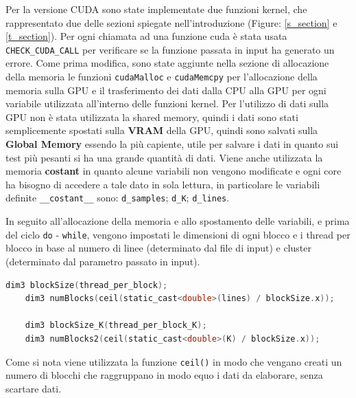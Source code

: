 \documentclass{article}
\begin{document}
  Per la versione CUDA sono state implementate due funzioni kernel, che rappresentato due delle sezioni spiegate nell'introduzione (Figure: \ref{s_section} e \ref{t_section}). Per ogni chiamata ad una funzione cuda è stata usata \verb|CHECK_CUDA_CALL| per verificare se la funzione passata in input ha generato un errore.
  Come prima modifica, sono state aggiunte nella sezione di allocazione della memoria le funzioni \verb|cudaMalloc| e \verb|cudaMemcpy| per l'allocazione della memoria sulla GPU e il trasferimento dei dati dalla CPU alla GPU per ogni
  variabile utilizzata all'interno delle funzioni kernel. Per l'utilizzo di dati sulla GPU non è stata utilizzata la shared memory, quindi i dati sono stati semplicemente spostati sulla \textbf{VRAM} della GPU, quindi sono salvati sulla \textbf{Global Memory} essendo la più capiente, utile 
  per salvare i dati in quanto sui test più pesanti si ha una grande quantità di dati. Viene anche utilizzata 
  la memoria \textbf{costant} in quanto alcune variabili non vengono modificate e ogni core ha bisogno di accedere a tale dato in sola lettura, in particolare le variabili definite \verb|__costant__| sono: \verb|d_samples|; \verb|d_K|; \verb|d_lines|.
  
  In seguito all'allocazione della memoria e allo spostamento delle variabili, e prima del ciclo \verb|do| - \verb|while|, 
  vengono impostati le dimensioni di ogni blocco e i thread per blocco in base al numero di linee (determinato dal file di input) e cluster (determinato dal parametro passato in input).
  \begin{lstlisting}[language=C]
    dim3 blockSize(thread_per_block);
    dim3 numBlocks(ceil(static_cast<double>(lines) / blockSize.x));

    dim3 blockSize_K(thread_per_block_K);
    dim3 numBlocks2(ceil(static_cast<double>(K) / blockSize.x));
  \end{lstlisting}
  Come si nota viene utilizzata la funzione \verb|ceil()| in modo che vengano creati un numero di blocchi che raggruppano in modo equo i dati da elaborare, senza scartare dati.
\end{document}
